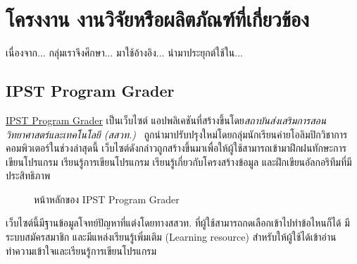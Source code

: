 \documentclass[12pt,one side,openright,a4paper]{cpe-thesis-th}
\newcommand{\thaijustify}[1]{%
  \par\hspace{30pt}\justifying
  #1
}
\begin{document}
\section{โครงงาน งานวิจัยหรือผลิตภัณฑ์ที่เกี่ยวข้อง}
    เนื่องจาก... กลุ่มเราจึงศึกษา... มาใช้อ้างอิง... นำมาประยุกต์ใช้ใน...
    \subsection{IPST Program Grader}
        \thaijustify{
            \href{https://programming.in.th}{IPST Program Grader} เป็นเว็บไซต์ แอปพลิเคชันที่สร้างขึ้นโดย\textit{สถาบันส่งเสริมการสอนวิทยาศาสตร์และเทคโนโลยี (สสวท.)}~\cite{ipstGrader} ถูกนำมาปรับปรุงใหม่โดยกลุ่มนักเรียนค่ายโอลิมปิกวิชาการคอมพิวเตอร์ในช่วงล่าสุดนี้ เว็บไซต์ดังกล่าวถูกสร้างขึ้นมาเพื่อให้ผู้ใช้สามารถเข้ามาฝึกฝนทักษะการเขียนโปรแกรม เรียนรู้การเขียนโปรแกรม เรียนรู้เกี่ยวกับโครงสร้างข้อมูล และฝึกเขียนอัลกอริทึมที่มีประสิทธิภาพ
        }
        \begin{figure}[H]
            \centering
            \caption[หน้าหลักของ IPST Program Grader]{หน้าหลักของ IPST Program Grader}
            \label{fig:ipst-page}
        \end{figure}
        \thaijustify{
            เว็บไซต์นี้มีฐานข้อมูลโจทย์ปัญหาที่แต่งโดยทางสสวท. ที่ผู้ใช้สามารถกดเลือกเข้าไปทำข้อไหนก็ได้ มีระบบสมัครสมาชิก และมีแหล่งเรียนรู้เพิ่มเติม (Learning resource) สำหรับให้ผู้ใช้ได้เข้าอ่านทำความเข้าใจและเรียนรู้การเขียนโปรแกรม
        }
\end{document}

